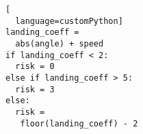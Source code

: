 \begin{lstlisting}[
  language=customPython]
landing_coeff =
  abs(angle) + speed
if landing_coeff < 2:
  risk = 0
else if landing_coeff > 5:
  risk = 3
else:
  risk =
   floor(landing_coeff) - 2
  \end{lstlisting}
